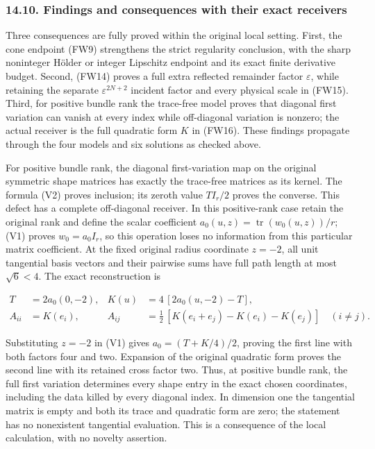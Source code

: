 \documentclass[
  11pt,
]{article}
\begin{document}
\subsubsection{14.10. Findings and consequences with their exact
receivers}\label{findings-and-consequences-with-their-exact-receivers}

Three consequences are fully proved within the original local setting.
First, the cone endpoint (FW9) strengthens the strict regularity
conclusion, with the sharp noninteger Hölder or integer Lipschitz
endpoint and its exact finite derivative budget. Second, (FW14) proves a
full extra reflected remainder factor \(\varepsilon\), while retaining
the separate \(\varepsilon^{2N+2}\) incident factor and every physical
scale in (FW15). Third, for positive bundle rank the trace-free model
proves that diagonal first variation can vanish at every index while
off-diagonal variation is nonzero; the actual receiver is the full
quadratic form \(K\) in (FW16). These findings propagate through the
four models and six solutions as checked above.

For positive bundle rank, the diagonal first-variation map on the
original symmetric shape matrices has exactly the trace-free matrices as
its kernel. The formula (V2) proves inclusion; its zeroth value
\(TI_r/2\) proves the converse. This defect has a complete off-diagonal
receiver. In this positive-rank case retain the original rank and define
the scalar coefficient \(a_0(u,z)=\operatorname{tr}(w_0(u,z))/r\); (V1)
proves \(w_0=a_0I_r\), so this operation loses no information from this
particular matrix coefficient. At the fixed original radius coordinate
\(z=-2\), all unit tangential basis vectors and their pairwise sums have
full path length at most \(\sqrt6<4\). The exact reconstruction is

\[
 \begin{aligned}
 T&=2a_0(0,-2),& K(u)&=4\,[2a_0(u,-2)-T],\\
 A_{ii}&=K(e_i),&
 A_{ij}&=\tfrac12\,[K(e_i+e_j)-K(e_i)-K(e_j)]\quad(i\ne j).
 \end{aligned}\tag{FW17}
\]

Substituting \(z=-2\) in (V1) gives \(a_0=(T+K/4)/2\), proving the first
line with both factors four and two. Expansion of the original quadratic
form proves the second line with its retained cross factor two. Thus, at
positive bundle rank, the full first variation determines every shape
entry in the exact chosen coordinates, including the data killed by
every diagonal index. In dimension one the tangential matrix is empty
and both its trace and quadratic form are zero; the statement has no
nonexistent tangential evaluation. This is a consequence of the local
calculation, with no novelty assertion.
\end{document}
